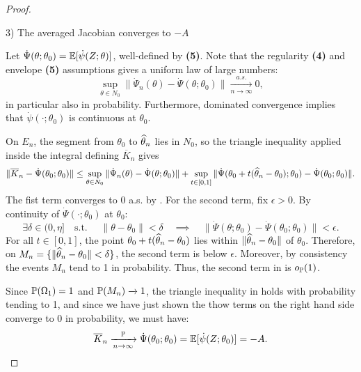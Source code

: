 \begin{proof}
  \begin{description}
    \item[3) The averaged Jacobian converges to $-A$] 
  \end{description}
  Let $\dot\Psi(\theta;\theta_0) = \E[\dot\psi(Z;\theta)]$, well-defined by \textbf{(5)}. Note that
  the regularity \textbf{(4)} and envelope \textbf{(5)} assumptions gives a uniform law of large
  numbers: 
  \begin{equation} 
    \sup_{\theta \in N_0} \| \dot\Psi_n(\theta) - \dot\Psi(\theta; \theta_0) \| \xrightarrow[n \to
    \infty ]{a.s.} 0
    \label{eq:disp2-ulln}
  ,\end{equation}
  in particular also in probability. Furthermore, dominated convergence implies that $\dot\psi(\cdot
  ;\theta_0)$ is continuous at $\theta_0$.

  On $E_n$, the segment from $\theta_0$ to $\what{\theta}_n$ lies in $N_0$, so the triangle
  inequality applied inside the integral defining $\overline{K}_n$ gives  
  \begin{equation} 
  \| \overline{K}_n - \dot\Psi(\theta_0;\theta_0) \| \le  \sup_{\theta \in N_0} \|
  \dot\Psi_n(\theta) - \dot\Psi(\theta;\theta_0) \| + \sup_{t \in [0,1]} \| \dot\Psi (\theta_0 +
  t(\what{\theta}_n - \theta_0);\theta_0) - \dot\Psi(\theta_0; \theta_0)\|
  \label{eq:disp2-triangle-ineq}
  .\end{equation}
  The fist term converges to 0 a.s. by . For the second term, fix $\epsilon >0$.
  By continuity of $\dot\Psi(\cdot ;\theta_0)$ at $\theta_0$:
  \[ 
    \exists \delta \in (0, \eta] 
    \quad  \text{s.t. }\quad
    \| \theta - \theta_0 \| < \delta 
    \quad \implies  \quad 
    \| \dot\Psi(\theta;\theta_0) - \dot\Psi(\theta_0; \theta_0) \| < \epsilon
  .\]
  For all $t \in [0,1]$, the point $\theta_0 + t(\what{\theta}_n- \theta_0)$ lies within $\|
  \what{\theta}_n - \theta_0 \|$ of $\theta_0$. Therefore, on $M_n = \{ \| \what{\theta}_n  -
  \theta_0\| <\delta\}$, the second term is below $\epsilon$. Moreover, by consistency the events
  $M_n$ tend to 1 in probability. Thus, the second term in  is $o_{\P}
  (1)$.

  Since $\P(\Omega_1) = 1$ and $\P(M_n) \xrightarrow[]{} 1$, the triangle inequality in
   holds with probability tending to 1, and since we have just shown
  the thow terms on the right hand side converge to 0 in probability, we must have:
  \[ 
  \overline{K}_n \xrightarrow[n \to \infty ]{\P} \dot \Psi(\theta_0;\theta_0) =
  \E[\dot\psi(Z;\theta_0)] =- A
  .\]


\end{proof}
